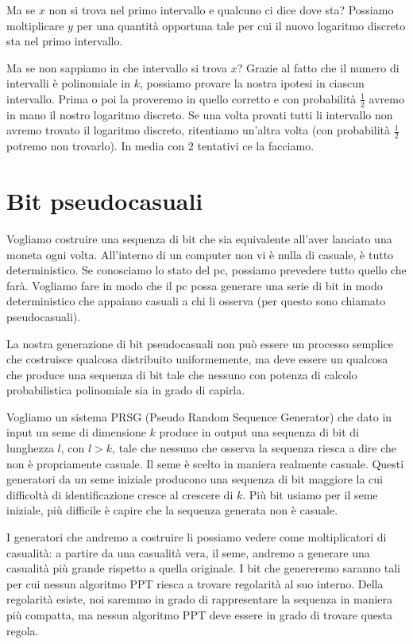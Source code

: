 \begin{itemize}
    Ma se $x$ non si trova nel primo intervallo e qualcuno ci dice dove sta? Possiamo moltiplicare $y$ per una quantità opportuna tale per cui il nuovo logaritmo discreto sta nel primo intervallo. 

    Ma se non sappiamo in che intervallo si trova $x$? Grazie al fatto che il numero di intervalli è polinomiale in $k$, possiamo provare la nostra ipotesi in ciascun intervallo. Prima o poi la proveremo in quello corretto e con probabilità $\frac{1}{2}$ avremo in mano il nostro logaritmo discreto. Se una volta provati tutti li intervallo non avremo trovato il logaritmo discreto, ritentiamo un'altra volta (con probabilità $\frac{1}{2}$ potremo non trovarlo). In media con $2$ tentativi ce la facciamo. 
\end{itemize}

\section{Bit pseudocasuali}
Vogliamo costruire una sequenza di bit che sia equivalente all'aver lanciato una moneta ogni volta. All'interno di un computer non vi è nulla di casuale, è tutto deterministico. Se conosciamo lo stato del pc, possiamo prevedere tutto quello che farà. Vogliamo fare in modo che il pc possa generare una serie di bit in modo deterministico che appaiano casuali a chi li osserva (per questo sono chiamato pseudocasuali).

La nostra generazione di bit pseudocasuali non può essere un processo semplice che costruisce qualcosa distribuito uniformemente, ma deve essere un qualcosa che produce una sequenza di bit tale che nessuno con potenza di calcolo probabilistica polinomiale sia in grado di capirla. 

Vogliamo un sistema PRSG (Pseudo Random Sequence Generator) che dato in input un seme di dimensione $k$ produce in output una sequenza di bit di lunghezza $l$, con $l>k$, tale che nessuno che osserva la sequenza riesca a dire che non è propriamente casuale. Il seme è scelto in maniera realmente casuale. Questi generatori da un seme iniziale producono una sequenza di bit maggiore la cui difficoltà di identificazione cresce al crescere di $k$. Più bit usiamo per il seme iniziale, più difficile è capire che la sequenza generata non è casuale. 

I generatori che andremo a costruire li possiamo vedere come moltiplicatori di casualità: a partire da una casualità vera, il seme, andremo a generare una casualità più grande rispetto a quella originale. I bit che genereremo saranno tali per cui nessun algoritmo PPT riesca a trovare regolarità al suo interno. Della regolarità esiste, noi saremmo in grado di rappresentare la sequenza in maniera più compatta, ma nessun algoritmo PPT deve essere in grado di trovare questa regola. 


